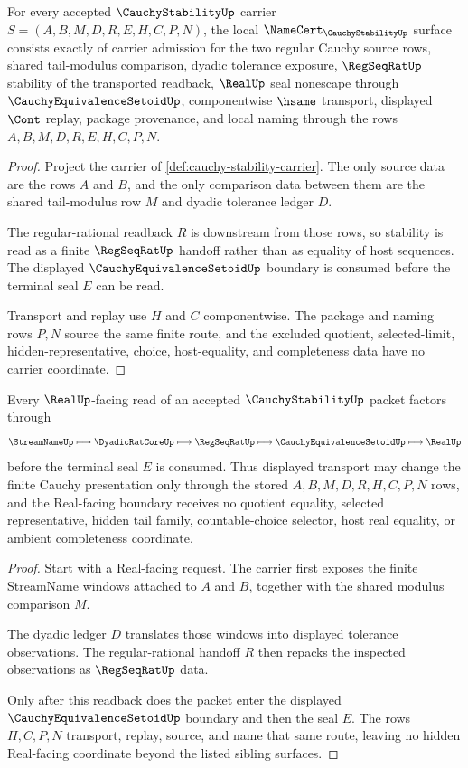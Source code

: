 \begin{theorem}
\label{thm:cauchy-stability-namecert-obligations}
For every accepted $\CauchyStabilityUp$ carrier $S=(A,B,M,D,R,E,H,C,P,N)$, the local $\NameCert_{\CauchyStabilityUp}$ surface consists exactly of carrier admission for the two regular Cauchy source rows, shared tail-modulus comparison, dyadic tolerance exposure, $\RegSeqRatUp$ stability of the transported readback, $\RealUp$ seal nonescape through $\CauchyEquivalenceSetoidUp$, componentwise $\hsame$ transport, displayed $\Cont$ replay, package provenance, and local naming through the rows $A,B,M,D,R,E,H,C,P,N$.
\end{theorem}
\begin{proof}
Project the carrier of \autoref{def:cauchy-stability-carrier}. The only source data are the rows $A$ and $B$, and the only comparison data between them are the shared tail-modulus row $M$ and dyadic tolerance ledger $D$.

The regular-rational readback $R$ is downstream from those rows, so stability is read as a finite $\RegSeqRatUp$ handoff rather than as equality of host sequences. The displayed $\CauchyEquivalenceSetoidUp$ boundary is consumed before the terminal seal $E$ can be read.

Transport and replay use $H$ and $C$ componentwise. The package and naming rows $P,N$ source the same finite route, and the excluded quotient, selected-limit, hidden-representative, choice, host-equality, and completeness data have no carrier coordinate.
\end{proof}

\begin{theorem}
\label{thm:cauchy-stability-real-seal-handoff}
Every $\RealUp$-facing read of an accepted $\CauchyStabilityUp$ packet factors through
$$
\StreamNameUp \longmapsto \DyadicRatCoreUp \longmapsto \RegSeqRatUp \longmapsto \CauchyEquivalenceSetoidUp \longmapsto \RealUp
$$
before the terminal seal $E$ is consumed. Thus displayed transport may change the finite Cauchy presentation only through the stored $A,B,M,D,R,H,C,P,N$ rows, and the Real-facing boundary receives no quotient equality, selected representative, hidden tail family, countable-choice selector, host real equality, or ambient completeness coordinate.
\end{theorem}
\begin{proof}
Start with a Real-facing request. The carrier first exposes the finite StreamName windows attached to $A$ and $B$, together with the shared modulus comparison $M$.

The dyadic ledger $D$ translates those windows into displayed tolerance observations. The regular-rational handoff $R$ then repacks the inspected observations as $\RegSeqRatUp$ data.

Only after this readback does the packet enter the displayed $\CauchyEquivalenceSetoidUp$ boundary and then the seal $E$. The rows $H,C,P,N$ transport, replay, source, and name that same route, leaving no hidden Real-facing coordinate beyond the listed sibling surfaces.
\end{proof}

